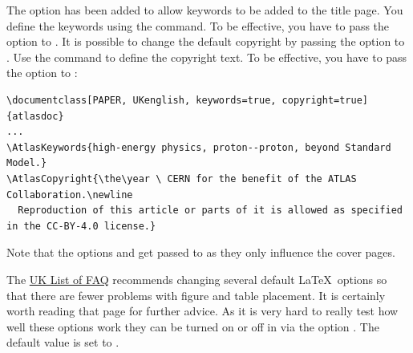  The option  has been added to allow keywords to be added to the title page.
You define the keywords using the  command.
To be effective, you have to pass the  option to .
It is possible to change the default copyright by passing the  option to .
Use the  command to define the copyright text.
To be effective, you have to pass the  option to :
\begin{verbatim}
\documentclass[PAPER, UKenglish, keywords=true, copyright=true]{atlasdoc}
...
\AtlasKeywords{high-energy physics, proton--proton, beyond Standard Model.}
\AtlasCopyright{\the\year \ CERN for the benefit of the ATLAS Collaboration.\newline
  Reproduction of this article or parts of it is allowed as specified in the CC-BY-4.0 license.}
\end{verbatim}

Note that the options  and  get passed to 
as they only influence the cover pages.

The
\href{http://www.tex.ac.uk/cgi-bin/texfaq2html?label=floats}{UK List of FAQ}
recommends changing several default \LaTeX\ options so that there are fewer problems
with figure and table placement.
It is certainly worth reading that page for further advice.
As it is very hard to really test how well these options work
they can be turned on or off in  via the option .
The default value is set to .


